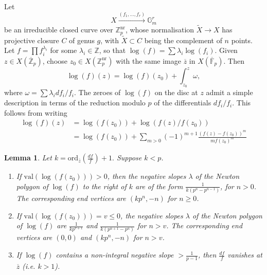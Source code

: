 \documentclass{amsart}
\def\Z{\mathbb Z}
\newcommand{\ord}{\mathrm{ord}}
\newcommand{\val}{\mathrm{val}}
\newtheorem{lemma}{Lemma}
\theoremstyle{definition}
\newcommand{\F}{\mathbb{F}}
\begin{document}
Let 
\[
X\stackrel{(f_1 ,\ldots ,f_r )}{\longrightarrow }\mathbb{G}_m ^r
\]
be an irreducible closed curve over $\mathbb{Z}_p ^{\mathrm{nr}}$, whose normalisation $\widetilde{X}\to X$ has projective closure $C$ of genus $g$, with $\widetilde{X}\subset C$ being the complement of $n$ points. Let $f=\prod f_i ^{\lambda _i }$ for some $\lambda _i \in \Z $, so that $\log (f)=\sum \lambda _i \log (f_i )$. Given $z\in X(\overline{\Z }_p )$, choose $z_0 \in X(\Z _p ^{\mathrm{nr}})$ with the same image $\overline{z}$ in $X(\overline{\F }_p )$. Then
\[
\log (f)(z)=\log (f)(z_0 )+\int ^{z}_{z_0 }\omega ,
\]
where $\omega =\sum \lambda _i df_i /f_i $. The zeroes of $\log (f)$ on the disc at $z$ admit a simple description in terms of the reduction modulo $p$ of the differentials $df_i /f_i $. This follows from writing
\begin{align}\label{eqn:slp}
\log (f)(z) & =\log (f(z_0 ))+\log (f(z)/f(z_0 ))  \nonumber \\
& = \log (f(z_0 ))+\sum _{m>0}(-1)^{m+1}\frac{(f(z)-f(z_0 ))^m }{mf(z_0 )^m }
\end{align}
\begin{lemma}\label{lemma:slop}
Let $k =\ord _{\overline{z}}(\frac{df}{f})+1.$ Suppose $k<p$.
\begin{enumerate}
\item If $\val (\log (f(z_0 )))>0$, then the negative slopes $\lambda$ of the Newton polygon of $\log (f)$ to the right of $k$ are of the form $\frac{1}{k(p^n-p^{n-1})}$, for $n>0$. The corresponding end vertices are $(kp^n,-n)$ for $n\geq 0$.
\item If $\val (\log (f(z_0 )))=v\leq 0$, the negative slopes $\lambda $ of the Newton polygon of $\log (f)$ are $\frac{1}{k p^{v+1}}$ and $\frac{1}{k(p^{n+1}-p^{n})}$ for $n>v$. The corresponding end vertices are $(0,0)$ and $(kp^n ,-n)$ for $n>v$.
\item If $\log (f)$ contains a non-integral negative slope $>\frac{1}{p-1}$, then $\frac{df}{f}$ vanishes at $\overline{z}$ (i.e. $k>1$).
\end{enumerate}
\end{lemma}
\end{document}
